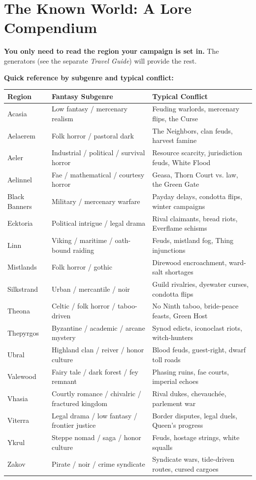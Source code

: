 \chapter{The Known World: A Lore Compendium}
\label{ch:lore-compendium}

\begin{tcolorbox}[colback=blue!5!white, colframe=blue!75!black, title=Using This Compendium,breakable]
\textbf{You only need to read the region your campaign is set in.} The generators (see the separate \textit{Travel Guide}) will provide the rest.

\medskip
\textbf{Quick reference by subgenre and typical conflict:}

\small
\begin{tabularx}{\linewidth}{lXX}
\toprule
\textbf{Region} & \textbf{Fantasy Subgenre} & \textbf{Typical Conflict} \\
\midrule
Acasia & Low fantasy / mercenary realism & Feuding warlords, mercenary flips, the Curse \\
Aelaerem & Folk horror / pastoral dark & The Neighbors, clan feuds, harvest famine \\
Aeler & Industrial / political / survival horror & Resource scarcity, jurisdiction feuds, White Flood \\
Aelinnel & Fae / mathematical / courtesy horror & Geasa, Thorn Court vs. law, the Green Gate \\
Black Banners & Military / mercenary warfare & Payday delays, condotta flips, winter campaigns \\
Ecktoria & Political intrigue / legal drama & Rival claimants, bread riots, Everflame schisms \\
Linn & Viking / maritime / oath-bound raiding & Feuds, mistland fog, Thing injunctions \\
Mistlands & Folk horror / gothic & Direwood encroachment, ward-salt shortages \\
Silkstrand & Urban / mercantile / noir & Guild rivalries, dyewater curses, condotta flips \\
Theona & Celtic / folk horror / taboo-driven & No Ninth taboo, bride-peace feasts, Green Host \\
Thepyrgos & Byzantine / academic / arcane mystery & Synod edicts, iconoclast riots, witch-hunters \\
Ubral & Highland clan / reiver / honor culture & Blood feuds, guest-right, dwarf toll roads \\
Valewood & Fairy tale / dark forest / fey remnant & Phasing ruins, fae courts, imperial echoes \\
Vhasia & Courtly romance / chivalric / fractured kingdom & Rival dukes, chevauchée, parlement war \\
Viterra & Legal drama / low fantasy / frontier justice & Border disputes, legal duels, Queen's progress \\
Ykrul & Steppe nomad / saga / honor culture & Feuds, hostage strings, white squalls \\
Zakov & Pirate / noir / crime syndicate & Syndicate wars, tide-driven routes, cursed cargoes \\
\bottomrule
\end{tabularx}
\normalsize


\end{tcolorbox}
